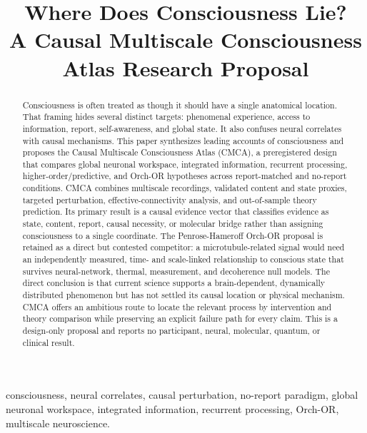 \documentclass[conference]{IEEEtran}
\begin{document}
\title{Where Does Consciousness Lie?\\
\large A Causal Multiscale Consciousness Atlas Research Proposal}

\author{
}

\maketitle

\begin{abstract}
Consciousness is often treated as though it should have a single anatomical location. That framing hides several distinct targets: phenomenal experience, access to information, report, self-awareness, and global state. It also confuses neural correlates with causal mechanisms. This paper synthesizes leading accounts of consciousness and proposes the Causal Multiscale Consciousness Atlas (CMCA), a preregistered design that compares global neuronal workspace, integrated information, recurrent processing, higher-order/predictive, and Orch-OR hypotheses across report-matched and no-report conditions. CMCA combines multiscale recordings, validated content and state proxies, targeted perturbation, effective-connectivity analysis, and out-of-sample theory prediction. Its primary result is a causal evidence vector that classifies evidence as state, content, report, causal necessity, or molecular bridge rather than assigning consciousness to a single coordinate. The Penrose-Hameroff Orch-OR proposal is retained as a direct but contested competitor: a microtubule-related signal would need an independently measured, time- and scale-linked relationship to conscious state that survives neural-network, thermal, measurement, and decoherence null models. The direct conclusion is that current science supports a brain-dependent, dynamically distributed phenomenon but has not settled its causal location or physical mechanism. CMCA offers an ambitious route to locate the relevant process by intervention and theory comparison while preserving an explicit failure path for every claim. This is a design-only proposal and reports no participant, neural, molecular, quantum, or clinical result.
\end{abstract}

\begin{IEEEkeywords}
consciousness, neural correlates, causal perturbation, no-report paradigm, global neuronal workspace, integrated information, recurrent processing, Orch-OR, multiscale neuroscience.
\end{IEEEkeywords}
\end{document}
